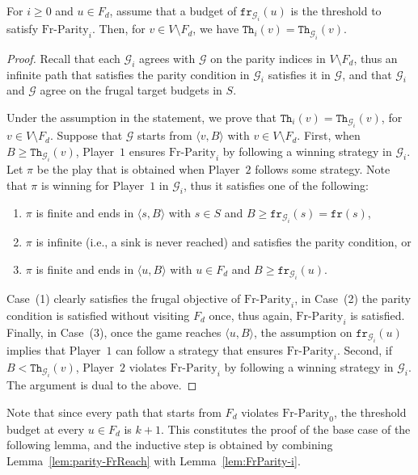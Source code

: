 \documentclass{article}\providecommand{\nequiv}{\not\equiv}\usepackage[a4paper,margin=20mm]{geometry}
\newcommand{\PO}{Player~$1$\xspace}
\newcommand{\PT}{Player~$2$\xspace}
\newcommand{\G}{{\mathcal G}}
\newcommand{\fr}{\texttt{fr}}
\newcommand{\notFd}{V \setminus F_d}
\newcommand{\thresh}{\texttt{Th}\xspace}
\newcommand{\frparity}{\text{Fr-Parity}}
\newcommand{\zug}[1]{\langle #1  \rangle}
\begin{document}
\begin{lemma}
	\label{lem:FrParity-i}
	For \(i \geq 0\) and \(u \in F_d\), assume that a budget of \(\fr_{\G_i}(u)\) is the threshold to satisfy \(\frparity_{i}\). Then, for \(v \in \notFd\), we have \(\thresh_i(v) = \thresh_{\G_i}(v)\). 
\end{lemma}



\begin{proof}
	Recall that each $\G_i$ agrees with $\G$ on the parity indices in $\notFd$, thus an infinite path that satisfies the parity condition in $\G_i$ satisfies it in $\G$, and that $\G_i$ and $\G$ agree on the frugal target budgets in $S$. 
	
	Under the assumption in the statement, we prove that $\thresh_{i}(v) = \thresh_{\G_i}(v)$, for $v \in \notFd$. 
	Suppose that $\G$ starts from $\zug{v, B}$ with $v \in \notFd$. First, when $B \geq \thresh_{\G_i}(v)$, \PO ensures $\frparity_i$ by following a winning strategy in $\G_i$. Let $\pi$ be the play that is obtained when \PT follows some strategy. Note that $\pi$ is winning for \PO in $\G_i$, thus it satisfies one of the following: 
	\begin{enumerate}
		\item $\pi$ is finite and ends in $\zug{s, B}$ with $s \in S$ and $B \geq \fr_{\G_i}(s) = \fr(s)$, 
		\item $\pi$ is infinite (i.e., a sink is never reached) and satisfies the parity condition,  or 
		\item $\pi$ is finite and ends in $\zug{u, B}$ with $u \in F_d$ and $B \geq \fr_{\G_i}(u)$. 
	\end{enumerate} 
	Case~(1) clearly satisfies the frugal objective of $\frparity_i$, in Case~(2) the parity condition is satisfied without visiting $F_d$ once, thus again, $\frparity_i$ is satisfied. 
	Finally, in Case~(3), once the game reaches $\zug{u, B}$, the assumption on \(\fr_{\G_i}(u)\) implies that \PO can follow a strategy that ensures \(\frparity_{i}\). 
	Second, if $B < \thresh_{\G_i}(v)$, \PT violates $\frparity_i$ by following a winning strategy in $\G_i$. The argument is dual to the above. 
\end{proof}


Note that since every path that starts from $F_d$ violates $\frparity_0$, the threshold budget at every $u \in F_d$ is $k+1$. This constitutes the proof of the base case of the following lemma, and the inductive step is obtained by combining Lemma~\ref{lem:parity-FrReach} with Lemma~\ref{lem:FrParity-i}.
\end{document}
